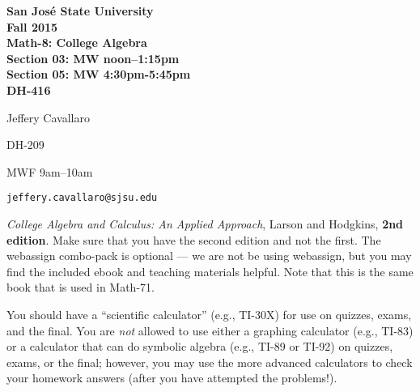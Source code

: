 \documentclass[letterpaper, 12pt]{article}
\begin{document}
\begin{center}
\bfseries
San Jos\'{e} State University \\
Fall 2015 \\
Math-8: College Algebra \\
Section 03: MW noon--1:15pm \\
Section 05: MW 4:30pm-5:45pm \\
DH-416
\end{center}

\bigskip

\begin{description}
\setlength{\itemsep}{0in}

\item[Instructor:] Jeffery Cavallaro

\item[Office:] DH-209

\item[Office hours:] MWF 9am--10am

\item[E-mail:] {\texttt{jeffery.cavallaro@sjsu.edu}}

\item[Texts:] \emph{College Algebra and Calculus: An Applied Approach},
  Larson and Hodgkins, \textbf{2nd edition}.  Make sure that you have the
  second edition and not the first.  The webassign combo-pack is optional ---
  we are not be using webassign, but you may find the included ebook and
  teaching materials helpful.  Note that this is the same book that is used
  in Math-71.

\item[Calculator:] You should have a ``scientific calculator'' (e.g., TI-30X)
  for use on quizzes, exams, and the final. You are \emph{not} allowed to use
  either a graphing calculator (e.g., TI-83) or a calculator that can do
  symbolic algebra (e.g., TI-89 or TI-92) on quizzes, exams, or the final;
  however, you may use the more advanced calculators to check your homework
  answers (after you have attempted the problems!).

\end{description}

\bigskip
\end{document}
